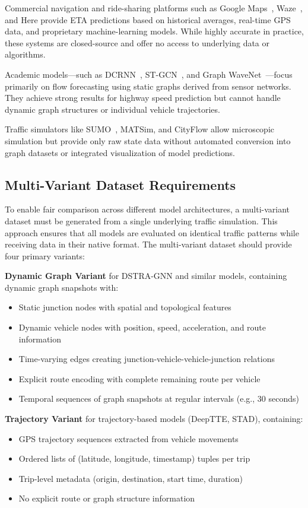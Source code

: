Commercial navigation and ride-sharing platforms such as Google Maps~\cite{derrowpinion2021googlemaps}, Waze~\cite{hoseinzadeh2020waze}, and Here provide ETA predictions based on historical averages, real-time GPS data, and proprietary machine-learning models. While highly accurate in practice, these systems are closed-source and offer no access to underlying data or algorithms.

Academic models—such as DCRNN~\cite{dcrnn2018}, ST-GCN~\cite{yu2018stgcn}, and Graph WaveNet~\cite{wu2019graphwavenet}—focus primarily on flow forecasting using static graphs derived from sensor networks. They achieve strong results for highway speed prediction but cannot handle dynamic graph structures or individual vehicle trajectories.

Traffic simulators like SUMO~\cite{SUMO2018}, MATSim, and CityFlow allow microscopic simulation but provide only raw state data without automated conversion into graph datasets or integrated visualization of model predictions.

\subsection{Multi-Variant Dataset Requirements}

To enable fair comparison across different model architectures, a multi-variant dataset must be generated from a single underlying traffic simulation. This approach ensures that all models are evaluated on identical traffic patterns while receiving data in their native format. The multi-variant dataset should provide four primary variants:

\textbf{Dynamic Graph Variant} for DSTRA-GNN and similar models, containing dynamic graph snapshots with:
\begin{itemize}
    \item Static junction nodes with spatial and topological features
    \item Dynamic vehicle nodes with position, speed, acceleration, and route information
    \item Time-varying edges creating junction-vehicle-vehicle-junction relations
    \item Explicit route encoding with complete remaining route per vehicle
    \item Temporal sequences of graph snapshots at regular intervals (e.g., 30 seconds)
\end{itemize}

\textbf{Trajectory Variant} for trajectory-based models (DeepTTE, STAD), containing:
\begin{itemize}
    \item GPS trajectory sequences extracted from vehicle movements
    \item Ordered lists of (latitude, longitude, timestamp) tuples per trip
    \item Trip-level metadata (origin, destination, start time, duration)
    \item No explicit route or graph structure information
\end{itemize}

